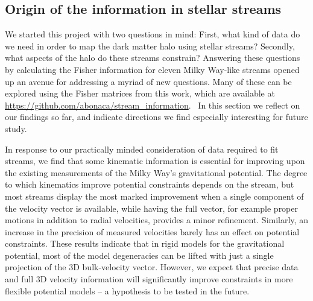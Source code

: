 \documentclass[modern]{aastex62}
\begin{document}
\subsection{Origin of the information in stellar streams}
\label{sec:dis_origin}
We started this project with two questions in mind:
First, what kind of data do we need in order to map the dark matter halo using stellar streams?
Secondly, what aspects of the halo do these streams constrain?
Answering these questions by calculating the Fisher information for eleven Milky Way-like streams opened up an avenue for addressing a myriad of new questions.
Many of these can be explored using the Fisher matrices from this work, which are available at \url{https://github.com/abonaca/stream_information}.\ %
In this section we reflect on our findings so far, and indicate directions we find especially interesting for future study.

In response to our practically minded consideration of data required to fit streams, we find that some kinematic information is essential for improving upon the existing measurements of the Milky Way's gravitational potential.
The degree to which kinematics improve potential constraints depends on the stream, but most streams display the most marked improvement when a single component of the velocity vector is available, while having the full vector, for example proper motions in addition to radial velocities, provides a minor refinement.
Similarly, an increase in the precision of measured velocities barely has an effect on potential constraints.
These results indicate that in rigid models for the gravitational potential, most of the model degeneracies can be lifted with just a single projection of the 3D bulk-velocity vector.
However, we expect that precise data and full 3D velocity information will significantly improve constraints in more flexible potential models  -- a hypothesis to be tested in the future.
\end{document}
